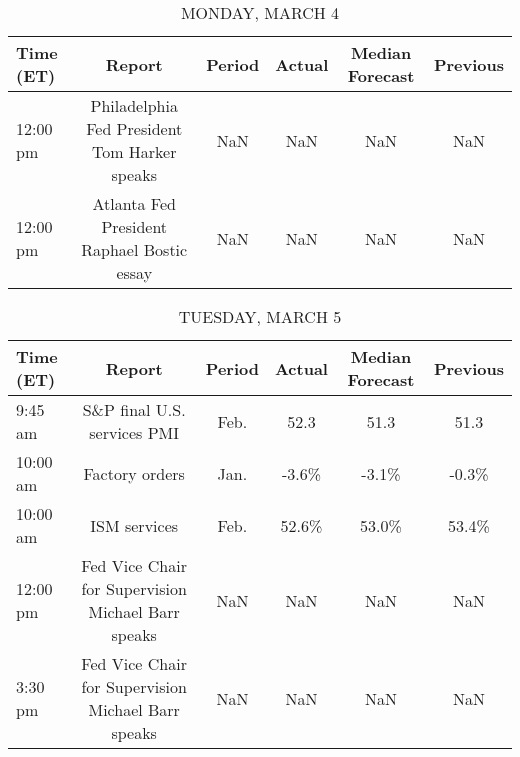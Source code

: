 \documentclass{article}%
\begin{document}
%
\normalsize%


\begin{table}[htbp]%
\caption{MONDAY, MARCH 4}%
\centering%
\begin{adjustbox}{width=1\textwidth}%
\begin{tabular}{lccccc}
\toprule
Time (ET) &                                       Report & Period & Actual & Median Forecast & Previous \\
\midrule
 12:00 pm & Philadelphia Fed President Tom Harker speaks &    NaN &    NaN &             NaN &      NaN \\
 12:00 pm &   Atlanta Fed President Raphael Bostic essay &    NaN &    NaN &             NaN &      NaN \\
\bottomrule
\end{tabular}
%
\end{adjustbox}%
\end{table}

%


\begin{table}[htbp]%
\caption{TUESDAY, MARCH 5}%
\centering%
\begin{adjustbox}{width=1\textwidth}%
\begin{tabular}{lccccc}
\toprule
Time (ET) &                                             Report & Period & Actual & Median Forecast & Previous \\
\midrule
  9:45 am &                        S\&P final U.S. services PMI &   Feb. &   52.3 &            51.3 &     51.3 \\
 10:00 am &                                     Factory orders &   Jan. &  -3.6\% &           -3.1\% &    -0.3\% \\
 10:00 am &                                       ISM services &   Feb. &  52.6\% &           53.0\% &    53.4\% \\
 12:00 pm & Fed Vice Chair for Supervision Michael Barr speaks &    NaN &    NaN &             NaN &      NaN \\
  3:30 pm & Fed Vice Chair for Supervision Michael Barr speaks &    NaN &    NaN &             NaN &      NaN \\
\bottomrule
\end{tabular}
%
\end{adjustbox}%
\end{table}

%
\end{document}
